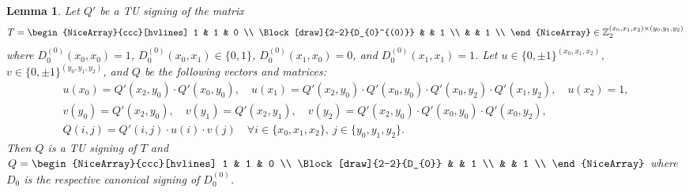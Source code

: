 \documentclass{article}
\newtheorem{lemma}{Lemma}
\theoremstyle{definition}
\begin{document}
\begin{lemma}\label{lem:three_sum_signing_helper}
    Let $Q'$ be a TU signing of the matrix
    \[
        T = \begin{NiceArray}{ccc}[hvlines]
            1 & 1 & 0 \\
            \Block[draw]{2-2}{D_{0}^{(0)}} & & 1 \\
             & & 1 \\
        \end{NiceArray} \in \mathbb{Z}_{2}^{(x_{0}, x_{1}, x_{2}) \times (y_{0}, y_{1}, y_{2})}
    \]
    where $D_{0}^{(0)} (x_{0}, x_{0}) = 1$, $D_{0}^{(0)} (x_{0}, x_{1}) \in \{0, 1\}$, $D_{0}^{(0)} (x_{1}, x_{0}) = 0$, and $D_{0}^{(0)} (x_{1}, x_{1}) = 1$. Let $u \in \{0, \pm 1\}^{(x_{0}, x_{1}, x_{2})}$, $v \in \{0, \pm 1\}^{(y_{0}, y_{1}, y_{2})}$, %
    and $Q$ be the following vectors and matrices:
    \begin{gather*}
        u(x_{0}) = Q' (x_{2}, y_{0}) \cdot Q' (x_{0}, y_{0}), \quad
        u(x_{1}) = Q' (x_{2}, y_{0}) \cdot Q' (x_{0}, y_{0}) \cdot Q' (x_{0}, y_{2}) \cdot Q' (x_{1}, y_{2}), \quad
        u(x_{2}) = 1, \\
        v(y_{0}) = Q' (x_{2}, y_{0}), \quad
        v(y_{1}) = Q' (x_{2}, y_{1}), \quad
        v(y_{2}) = Q' (x_{2}, y_{0}) \cdot Q' (x_{0}, y_{0}) \cdot Q' (x_{0}, y_{2}), \\
        Q (i, j) = Q' (i, j) \cdot u(i) \cdot v(j) \quad \forall i \in \{x_{0}, x_{1}, x_{2}\}, \ j \in \{y_{0}, y_{1}, y_{2}\}.
    \end{gather*}
    Then $Q$ is a TU signing of $T$ and $Q = \begin{NiceArray}{ccc}[hvlines] 1 & 1 & 0 \\ \Block[draw]{2-2}{D_{0}} & & 1 \\ & & 1 \\ \end{NiceArray}$ where $D_{0}$ is the respective canonical signing of $D_{0}^{(0)}$.
\end{lemma}
\end{document}
